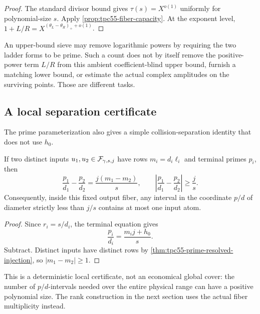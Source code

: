 \begin{proof}
The standard divisor bound \citep[Ch.~1]{MontgomeryVaughan2007} gives
\(\tau(s)=X^{o(1)}\) uniformly for
polynomial-size \(s\).  Apply \cref{prop:tpc55-fiber-capacity}.  At the
exponent level, \(1+L/R=X^{(\theta_L-\theta_R)_++o(1)}\).
\end{proof}

An upper-bound sieve may remove logarithmic powers by requiring the two
ladder forms to be prime.  Such a count does not by itself remove the
positive-power term \(L/R\) from this ambient coefficient-blind upper
bound, furnish a matching lower bound, or estimate the actual complex
amplitudes on the surviving points.  Those are different tasks.

\subsection{A local separation certificate}

The prime parameterization also gives a simple collision-separation
identity that does not use \(h_0\).

\begin{proposition}
\label{prop:tpc55-scaled-prime-gap}
If two distinct inputs \(u_1,u_2\in\mathcal F_{\gamma,s,j}\) have rows
\(m_i=d_i\ell_i\) and terminal primes \(p_i\), then
\begin{equation}
 \frac{p_1}{d_1}-\frac{p_2}{d_2}
 =\frac{j(m_1-m_2)}s,
 \qquad
 \left|\frac{p_1}{d_1}-\frac{p_2}{d_2}\right|
 \ge\frac js.
 \label{eq:tpc55-scaled-prime-gap}
\end{equation}
Consequently, inside this fixed output fiber, any interval in the
coordinate \(p/d\) of diameter strictly less than \(j/s\) contains at most
one input atom.
\end{proposition}

\begin{proof}
Since \(r_i=s/d_i\), the terminal equation gives
\[
 \frac{p_i}{d_i}=\frac{m_i j+h_0}{s}.
\]
Subtract.  Distinct inputs have distinct rows by
\cref{thm:tpc55-prime-resolved-injection}, so
\(|m_1-m_2|\ge1\).
\end{proof}

This is a deterministic local certificate, not an economical global cover:
the number of \(p/d\)-intervals needed over the entire physical range can
have a positive polynomial size.  The rank construction in the next
section uses the actual fiber multiplicity instead.
